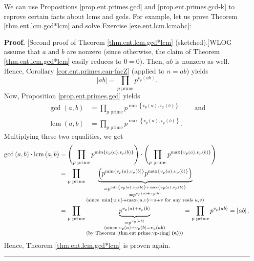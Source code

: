 \documentclass[numbers=enddot,12pt,final,onecolumn,notitlepage]{scrartcl}%
\numberwithin{exer}{subsection}
\theoremstyle{definition}
\newenvironment{fineprint}{\begin{small}}{\end{small}}
\newenvironment{proof}[1][Proof]{\noindent\textbf{#1.} }{\ \rule{0.5em}{0.5em}}
\let\prodnonlimits\prod
\renewcommand{\prod}{\prodnonlimits\limits}
\begin{document}
We can use Propositions \ref{prop.ent.primes.gcd} and
\ref{prop.ent.primes.gcd-k} to reprove certain facts about lcms and gcds. For
example, let us prove Theorem \ref{thm.ent.lcm.gcd*lcm} and solve Exercise
\ref{exe.ent.lcm.lcmabc}:

\begin{fineprint}
\begin{proof}
[Second proof of Theorem \ref{thm.ent.lcm.gcd*lcm} (sketched).]WLOG assume
that $a$ and $b$ are nonzero (since otherwise, the claim of Theorem
\ref{thm.ent.lcm.gcd*lcm} easily reduces to $0=0$). Then, $ab$ is nonzero as
well. Hence, Corollary \ref{cor.ent.primes.can-facZ} (applied to $n=ab$)
yields%
\[
\left\vert ab\right\vert =\prod_{p\text{ prime}}p^{v_{p}\left(  ab\right)  }.
\]
Now, Proposition \ref{prop.ent.primes.gcd} yields%
\begin{align*}
\gcd\left(  a,b\right)   &  =\prod_{p\text{ prime}}p^{\min\left\{
v_{p}\left(  a\right)  ,v_{p}\left(  b\right)  \right\}  }%
\ \ \ \ \ \ \ \ \ \ \text{and}\\
\operatorname{lcm}\left(  a,b\right)   &  =\prod_{p\text{ prime}}%
p^{\max\left\{  v_{p}\left(  a\right)  ,v_{p}\left(  b\right)  \right\}  }.
\end{align*}
Multiplying these two equalities, we get%
\begin{align*}
\gcd\left(  a,b\right)  \cdot\operatorname{lcm}\left(  a,b\right)   &
=\left(  \prod_{p\text{ prime}}p^{\min\left\{  v_{p}\left(  a\right)
,v_{p}\left(  b\right)  \right\}  }\right)  \cdot\left(  \prod_{p\text{
prime}}p^{\max\left\{  v_{p}\left(  a\right)  ,v_{p}\left(  b\right)
\right\}  }\right) \\
&  =\prod_{p\text{ prime}}\underbrace{\left(  p^{\min\left\{  v_{p}\left(
a\right)  ,v_{p}\left(  b\right)  \right\}  }p^{\max\left\{  v_{p}\left(
a\right)  ,v_{p}\left(  b\right)  \right\}  }\right)  }_{\substack{=p^{\min
\left\{  v_{p}\left(  a\right)  ,v_{p}\left(  b\right)  \right\}
+\max\left\{  v_{p}\left(  a\right)  ,v_{p}\left(  b\right)  \right\}
}\\=p^{v_{p}\left(  a\right)  +v_{p}\left(  b\right)  }\\\text{(since }%
\min\left\{  u,v\right\}  +\max\left\{  u,v\right\}  =u+v\text{ for any reals
}u,v\text{)}}}\\
&  =\prod_{p\text{ prime}}\underbrace{p^{v_{p}\left(  a\right)  +v_{p}\left(
b\right)  }}_{\substack{=p^{v_{p}\left(  ab\right)  }\\\text{(since }%
v_{p}\left(  a\right)  +v_{p}\left(  b\right)  =v_{p}\left(  ab\right)
\\\text{(by Theorem \ref{thm.ent.prime.vp-ring} \textbf{(a)}))}}%
}=\prod_{p\text{ prime}}p^{v_{p}\left(  ab\right)  }=\left\vert ab\right\vert
.
\end{align*}
Hence, Theorem \ref{thm.ent.lcm.gcd*lcm} is proven again.
\end{proof}


\end{fineprint}
\end{document}
